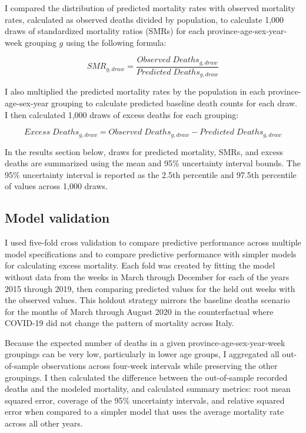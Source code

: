 \documentclass[
]{article}
\begin{document}
I compared the distribution of predicted mortality rates with observed mortality rates, calculated as observed deaths divided by population, to calculate 1,000 draws of standardized mortality ratios (SMRs) for each province-age-sex-year-week grouping \(g\) using the following formula:

\[SMR_{g,draw} = \frac{Observed\;Deaths_{g,draw}}{Predicted\;Deaths_{g,draw}}\]

I also multiplied the predicted mortality rates by the population in each province-age-sex-year grouping to calculate predicted baseline death counts for each draw. I then calculated 1,000 draws of excess deaths for each grouping:

\[Excess\;Deaths_{g,draw}=Observed\;Deaths_{g,draw}-Predicted\;Deaths_{g,draw}\]

In the results section below, draws for predicted mortality, SMRs, and excess deaths are summarized using the mean and 95\% uncertainty interval bounds. The 95\% uncertainty interval is reported as the 2.5th percentile and 97.5th percentile of values across 1,000 draws.

\hypertarget{model-validation}{%
\subsection{Model validation}\label{model-validation}}

I used five-fold cross validation to compare predictive performance across multiple model specifications and to compare predictive performance with simpler models for calculating excess mortality. Each fold was created by fitting the model without data from the weeks in March through December for each of the years 2015 through 2019, then comparing predicted values for the held out weeks with the observed values. This holdout strategy mirrors the baseline deaths scenario for the months of March through August 2020 in the counterfactual where COVID-19 did not change the pattern of mortality across Italy.

Because the expected number of deaths in a given province-age-sex-year-week groupings can be very low, particularly in lower age groups, I aggregated all out-of-sample observations across four-week intervals while preserving the other groupings. I then calculated the difference between the out-of-sample recorded deaths and the modeled mortality, and calculated summary metrics: root mean squared error, coverage of the 95\% uncertainty intervals, and relative squared error when compared to a simpler model that uses the average mortality rate across all other years.
\end{document}

